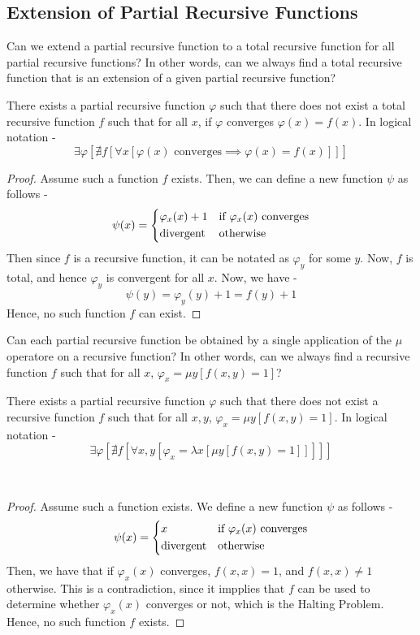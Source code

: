 \documentclass[openany]{book}
\begin{document}
\subsection{Extension of Partial Recursive Functions}
Can we extend a partial recursive function to a total recursive function for all partial recursive functions? In other words, can we always find a total recursive function that is an extension of a given partial recursive function?
\begin{mytheorem}
    There exists a partial recursive function $\varphi$ such that there does not exist a total recursive function $f$ such that for all $x$, if $\varphi$ converges $\varphi(x) = f(x)$. In logical notation - 
    $$\exists \varphi[\nexists f[\forall x[\varphi(x) \text{ converges} \implies \varphi(x) = f(x)]]]$$
\end{mytheorem}
\begin{proof}
    Assume such a function $f$ exists. Then, we can define a new function $\psi$ as follows - 
    $$\psi(x) = \begin{dcases}
        \varphi_x (x) + 1 & \text{if } \varphi_x (x) \text{ converges} \\
        \text{divergent} & \text{otherwise}
    \end{dcases}$$
    Then since $f$ is a recursive function, it can be notated as $\varphi_y$ for some $y$. Now, $f$ is total, and hence $\varphi_y$ is convergent for all $x$. 
    Now, we have - 
    $$\psi(y) = \varphi_y(y) + 1 = f(y) + 1$$
    Hence, no such function $f$ can exist. 
\end{proof}
Can each partial recursive function be obtained by a single application of the $\mu$ operatore on a recursive function? In other words, can we always find a recursive function $f$ such that for all $x$, $\varphi_x = \mu y[f(x, y) = 1]$?
\begin{mytheorem}
    There exists a partial recursive function $\varphi$ such that there does not exist a recursive function $f$ such that for all $x, y$, $\varphi_x = \mu y[f(x, y) = 1]$. In logical notation - 
    $$\exists \varphi[\nexists f[\forall x, y[\varphi_x = \lambda x[\mu y[f(x, y) = 1]]]]]$$
\end{mytheorem}\
\begin{proof}
    Assume such a function exists. We define a new function $\psi$ as follows -
    $$\psi(x) = \begin{dcases}
        x & \text{if } \varphi_x (x) \text{ converges} \\
        \text{divergent} & \text{otherwise}
        \end{dcases}$$
    Then, we have that if $\varphi_x (x)$ converges, $f(x, x) = 1$, and $f(x, x) \neq 1$ otherwise. This is a contradiction, since it impplies that $f$ can be used to determine whether $\varphi_x (x)$ converges or not, which is the Halting Problem. Hence, no such function $f$ exists.
\end{proof}
\end{document}

